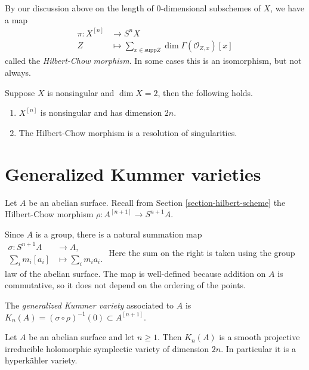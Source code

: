 By our discussion above on the length of
0-dimensional subschemes of $X$,
we have a map
$$
\begin{aligned}
\pi : X^{[n]} &\longrightarrow S^nX \\
 Z&\longmapsto \sum_{x \in \text{supp}Z}\dim
\Gamma(\mathcal{O}_{Z,x})[x]
\end{aligned}
$$
called the {\it Hilbert-Chow morphism}.
In some cases this is an isomorphism, but
not always.

\begin{theorem}
\label{theorem-fogarty}
Suppose $X$ is nonsingular and $\dim X=2$,
then the following holds.
\begin{enumerate}
\item $X^{[n]}$ is nonsingular and has
dimension $2n$.
\item The Hilbert-Chow morphism is a
resolution of singularities.
\end{enumerate}
\end{theorem}




\section{Generalized Kummer varieties}
\label{section-generalized-kummer}

\noindent
Let $A$ be an abelian surface. Recall from
Section
\ref{section-hilbert-scheme}
the Hilbert-Chow morphism
$
\rho:A^{[n+1]}\longrightarrow S^{n+1}A.
$

\noindent
Since $A$ is a group, there is a natural
summation map
$
\begin{aligned}
\sigma:S^{n+1}A&\longrightarrow A,\\
\sum_i m_i[a_i]&\longmapsto
\sum_i m_i a_i.
\end{aligned}
$
Here the sum on the right is taken using the
group law of the abelian surface. The map is
well-defined because addition on $A$ is
commutative, so it does not depend on the
ordering of the points.

\begin{definition}
\label{definition-generalized-kummer}
The {\it generalized Kummer variety}
associated to $A$ is
$
K_n(A)
=
(\sigma\circ\rho)^{-1}(0)
\subset A^{[n+1]}.
$
\end{definition}

\begin{theorem}[Beauville]
\label{theorem-generalized-kummer-hk}
Let $A$ be an abelian surface and let
$n\geq1$. Then $K_n(A)$ is a smooth
projective irreducible holomorphic symplectic
variety of dimension $2n$. In particular it
is a hyperk\"ahler variety.
\end{theorem}

